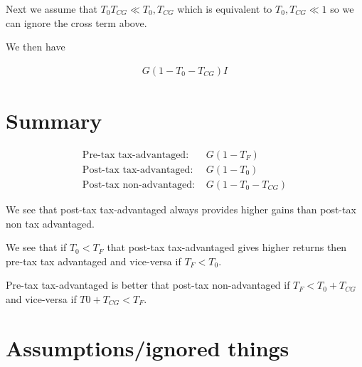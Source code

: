 \documentclass[12pt]{article}
\begin{document}
Next we assume that $T_0T_{CG} \ll T_0, T_{CG}$ which is equivalent to $T_0, T_{CG} \ll 1$ so we can ignore the cross term above.

We then have

\begin{align}
G(1-T_0- T_{CG})I
\end{align}

\section{Summary}

\begin{align}
\text{Pre-tax tax-advantaged: }& G(1-T_F)\\
\text{Post-tax tax-advantaged: }& G(1-T_0)\\
\text{Post-tax non-advantaged: }& G(1-T_0-T_{CG})
\end{align}

We see that post-tax tax-advantaged always provides higher gains than post-tax non tax advantaged.

We see that if $T_0<T_F$ that post-tax tax-advantaged gives higher returns then pre-tax tax advantaged and vice-versa if $T_F<T_0$.

Pre-tax tax-advantaged is better that post-tax non-advantaged if $T_F<T_0+T_{CG}$ and vice-versa if $T0 + T_{CG} < T_F$.

\section{Assumptions/ignored things}
\end{document}

